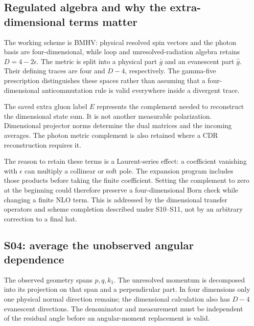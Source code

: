 \documentclass[11pt,a4paper]{article}
\newcommand{\eps}{\epsilon}
\begin{document}
\subsection{Regulated algebra and why the extra-dimensional terms matter}
The working scheme is BMHV: physical resolved spin vectors and the photon basis are four-dimensional, while loop and unresolved-radiation algebra retains $D=4-2\eps$. The metric is split into a physical part $\bar g$ and an evanescent part $\widehat g$. Their defining traces are four and $D-4$, respectively. The gamma-five prescription distinguishes these spaces rather than assuming that a four-dimensional anticommutation rule is valid everywhere inside a divergent trace.

The saved extra gluon label $E$ represents the complement needed to reconstruct the dimensional state sum. It is not another measurable polarization. Dimensional projector norms determine the dual matrices and the incoming averages. The photon metric complement is also retained where a CDR reconstruction requires it.

The reason to retain these terms is a Laurent-series effect: a coefficient vanishing with $\eps$ can multiply a collinear or soft pole. The expansion program includes those products before taking the finite coefficient. Setting the complement to zero at the beginning could therefore preserve a four-dimensional Born check while changing a finite NLO term. This is addressed by the dimensional transfer operators and scheme completion described under S10--S11, not by an arbitrary correction to a final hat.

\subsection{S04: average the unobserved angular dependence}
The observed geometry spans $p,q,k_1$. The unresolved momentum is decomposed into its projection on that span and a perpendicular part. In four dimensions only one physical normal direction remains; the dimensional calculation also has $D-4$ evanescent directions. The denominator and measurement must be independent of the residual angle before an angular-moment replacement is valid.
\end{document}
